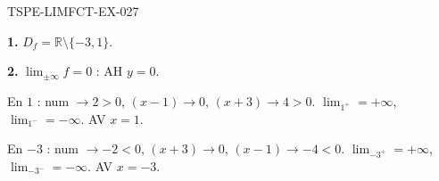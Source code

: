 \begin{corrige}{TSPE-LIMFCT-EX-027}

\textbf{1.} $D_f = \mathbb{R} \setminus \{-3, 1\}$.

\textbf{2.} $\lim_{\pm\infty} f = 0$ : AH $y = 0$.

En $1$ : num $\to 2 > 0$, $(x-1) \to 0$, $(x+3) \to 4 > 0$. $\lim_{1^+} = +\infty$, $\lim_{1^-} = -\infty$. AV $x = 1$.

En $-3$ : num $\to -2 < 0$, $(x+3) \to 0$, $(x-1) \to -4 < 0$. $\lim_{-3^+} = +\infty$, $\lim_{-3^-} = -\infty$. AV $x = -3$.

\end{corrige}
